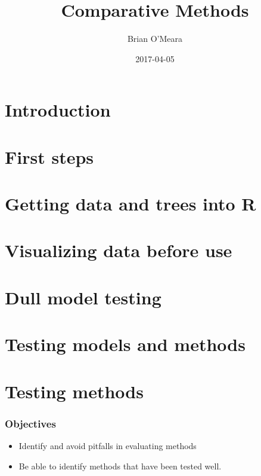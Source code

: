 \documentclass[]{book}
\title{Comparative Methods}
\author{Brian O'Meara}
\date{2017-04-05}
\providecommand{\tightlist}{%
  \setlength{\itemsep}{0pt}\setlength{\parskip}{0pt}}
\theoremstyle{definition}
\theoremstyle{definition}
\theoremstyle{remark}
\begin{document}
\maketitle

{
\setcounter{tocdepth}{1}
\tableofcontents
}
\chapter{Introduction}\label{introduction}

\chapter{First steps}\label{first-steps}

\chapter{Getting data and trees into
R}\label{getting-data-and-trees-into-r}

\chapter{Visualizing data before use}\label{visualizing-data-before-use}

\chapter{Dull model testing}\label{dull-model-testing}

\chapter{Testing models and methods}\label{testing-models-and-methods}

\chapter{Testing methods}\label{testing-methods}

\subsection{Objectives}\label{objectives}

\begin{itemize}
\tightlist
\item
  Identify and avoid pitfalls in evaluating methods
\item
  Be able to identify methods that have been tested well.
\end{itemize}
\end{document}
